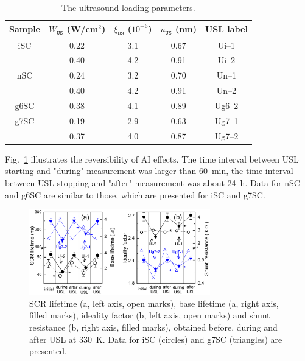 \documentclass[aip,jap, amsmath,amssymb,reprint]{revtex4-1}
\begin{document}
\begin{table}
\caption{\label{tabUSL}The ultrasound loading parameters.
}
\begin{ruledtabular}
\begin{tabular}{ccccc}
Sample&$W_{\mathtt{US}}$ (W/cm$^2$)&$\xi_{\mathtt{US}}$ ($10^{-6}$)&$u_{\mathtt{US}}$ (nm)&USL label\\
\hline
iSC&0.22&3.1&0.67&Ui--1\\
&0.40&4.2&0.91&Ui--2\\
nSC&0.24&3.2&0.70&Un--1\\
&0.40&4.2&0.91&Un--2\\
g6SC&0.38&4.1&0.89&Ug6--2\\
g7SC&0.19&2.9&0.63&Ug7--1\\
&0.37&4.0&0.87&Ug7--2\\
\end{tabular}
\end{ruledtabular}
\end{table}

Fig.~\ref{fig_Reverse} illustrates the reversibility of AI effects.
The time interval between USL starting and "during" measurement was larger than 60~min,
the time interval between USL stopping and "after" measurement was about 24~h.
Data for nSC and g6SC are similar to those, which are presented for iSC and g7SC.

\begin{figure}
\includegraphics[width=0.7\textwidth]{fig_2ab}%
\caption{\label{fig_Reverse}
SCR lifetime (a, left axis, open marks),
base lifetime (a, right axis, filled marks),
ideality factor (b, left axis, open marks) and
shunt resistance (b, right axis, filled marks),
obtained before, during and after USL at 330~K.
Data for iSC (circles) and g7SC (triangles) are presented.
}%
\end{figure}
\end{document}
